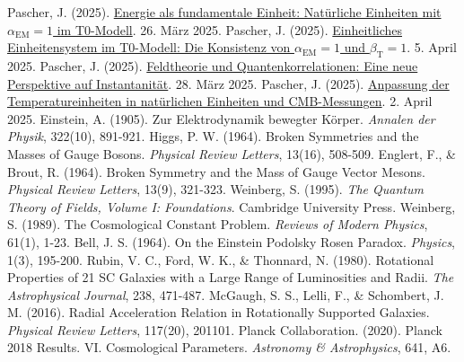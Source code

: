 \documentclass[a4paper,12pt]{article}
\newcommand{\betaT}{\beta_{\text{T}}}
\newcommand{\alphaEM}{\alpha_{\text{EM}}}
\begin{document}
\begin{thebibliography}{99}
		 Pascher, J. (2025). \href{https://github.com/jpascher/T0-Time-Mass-Duality/tree/main/2/pdf/Deutsch/NatEinheitenAlpha1.pdf}{Energie als fundamentale Einheit: Natürliche Einheiten mit \(\alphaEM = 1\) im T0-Modell}. 26. März 2025.
		 Pascher, J. (2025). \href{https://github.com/jpascher/T0-Time-Mass-Duality/tree/main/2/pdf/Deutsch/Alpha1Beta1Konsistenz.pdf}{Einheitliches Einheitensystem im T0-Modell: Die Konsistenz von \(\alphaEM = 1\) und \(\betaT = 1\)}. 5. April 2025.
		 Pascher, J. (2025). \href{https://github.com/jpascher/T0-Time-Mass-Duality/tree/main/2/pdf/Deutsch/FeldtheorieQuanten.pdf}{Feldtheorie und Quantenkorrelationen: Eine neue Perspektive auf Instantanität}. 28. März 2025.
		 Pascher, J. (2025). \href{https://github.com/jpascher/T0-Time-Mass-Duality/tree/main/2/pdf/Deutsch/TempEinheitenCMB.pdf}{Anpassung der Temperatureinheiten in natürlichen Einheiten und CMB-Messungen}. 2. April 2025.
		 Einstein, A. (1905). Zur Elektrodynamik bewegter Körper. \textit{Annalen der Physik}, 322(10), 891-921.
		 Higgs, P. W. (1964). Broken Symmetries and the Masses of Gauge Bosons. \textit{Physical Review Letters}, 13(16), 508-509.
		 Englert, F., \& Brout, R. (1964). Broken Symmetry and the Mass of Gauge Vector Mesons. \textit{Physical Review Letters}, 13(9), 321-323.
		 Weinberg, S. (1995). \textit{The Quantum Theory of Fields, Volume I: Foundations}. Cambridge University Press.
		 Weinberg, S. (1989). The Cosmological Constant Problem. \textit{Reviews of Modern Physics}, 61(1), 1-23.
		 Bell, J. S. (1964). On the Einstein Podolsky Rosen Paradox. \textit{Physics}, 1(3), 195-200.
		 Rubin, V. C., Ford, W. K., \& Thonnard, N. (1980). Rotational Properties of 21 SC Galaxies with a Large Range of Luminosities and Radii. \textit{The Astrophysical Journal}, 238, 471-487.
		 McGaugh, S. S., Lelli, F., \& Schombert, J. M. (2016). Radial Acceleration Relation in Rotationally Supported Galaxies. \textit{Physical Review Letters}, 117(20), 201101.
		 Planck Collaboration. (2020). Planck 2018 Results. VI. Cosmological Parameters. \textit{Astronomy \& Astrophysics}, 641, A6.
	\end{thebibliography}
	
\end{document}
